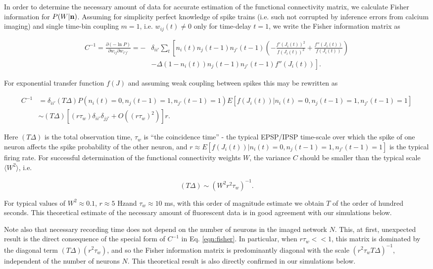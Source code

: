 In order to determine the necessary amount of data for accurate estimation of the functional connectivity matrix, we calculate Fisher information for $P(W|{\bf n})$. Assuming for simplicity perfect knowledge of spike trains (i.e. such not corrupted by inference errors from calcium imaging) and single time-bin coupling $m=1$, i.e. $w_{ij}(t)\neq 0$ only for time-delay $t=1$, we write the Fisher information matrix as

\begin{equation}
\begin{array}{rl}
C^{-1}=\frac{\partial (-\ln P)}{\partial w_{ij}\partial w_{i'j'}}
=-&\delta_{ii'}\sum\limits_t\left[
n_i(t)n_{j}(t-1)n_{j'}(t-1)\left(-\frac{f'(J_i(t))^2}{f(J_i(t))^2} +
\frac{f''(J_i(t))}{f(J_i(t))}\right) \right. \\
&\left.-\Delta (1-n_i(t))n_{j}(t-1)n_{j'}(t-1)f''(J_i(t))\right].
\end{array}
\end{equation}

For exponential transfer function $f(J)$ and assuming weak coupling between spikes this may be rewritten as

\begin{equation}\label{eqn:fisher}
\begin{array}{rl}
C^{-1}
&=\delta_{ii'} (T\Delta) P(n_i(t)=0, n_j(t-1)=1, n_{j'}(t-1)=1)E[f(J_i(t))|n_i(t)=0, n_j(t-1)=1, n_{j'}(t-1)=1] \\
&\sim (T\Delta)\left[(r \tau_w)\delta_{ii'}\delta_{jj'}+O((r \tau_w)^2)\right]r.
\end{array}
\end{equation}

Here $(T\Delta)$ is the total observation time, $ \tau_w$ is ``the coincidence time'' - the typical EPSP/IPSP time-scale over which the spike of one neuron affects the spike probability of the other neuron, and $r \approx E[f(J_i(t))|n_i(t)=0, n_j(t-1)=1, n_{j'}(t-1)=1]$ is the typical firing rate.  For successful determination of the functional connectivity weights $W$, the variance $C$ should be smaller than the typical scale $\langle W^2\rangle$, i.e.

\begin{equation}
(T\Delta) \sim (W^2 r^2  \tau_w)^{-1}.
\end{equation}

For typical values of $W^2\approx 0.1$, $r\approx 5$  Hzand $ \tau_w \approx 10$ ms, 
with this order of magnitude estimate we obtain $T$ of the order of hundred seconds.
This theoretical estimate of the necessary amount of fluorescent data is in good agreement with our simulations below.

Note also that necessary recording time does not depend on the number of neurons in the imaged network $N$. This, at first, unexpected result is the direct consequence of the special form of $C^{-1}$ in Eq. \eqref{eqn:fisher}. In particular, when $r \tau_w <<1$, this matrix is dominated by the diagonal term $(T\Delta)(r^2  \tau_w)$, and so the Fisher information matrix is predominantly diagonal with the scale $(r^2 \tau_w T\Delta)^{-1}$, independent of the number of neurons $N$. This theoretical result is also directly confirmed in our simulations below.
